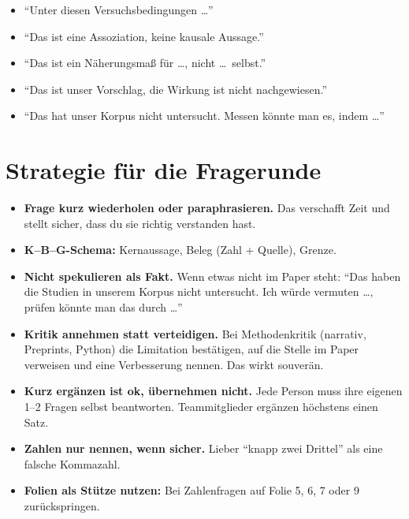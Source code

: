 \documentclass[12pt,a4paper]{article}
\begin{document}
\begin{merke}
\begin{itemize}
  \item \enquote{Unter diesen Versuchsbedingungen \dots}
  \item \enquote{Das ist eine Assoziation, keine kausale Aussage.}
  \item \enquote{Das ist ein Näherungsmaß für \dots, nicht \dots\ selbst.}
  \item \enquote{Das ist unser Vorschlag, die Wirkung ist nicht nachgewiesen.}
  \item \enquote{Das hat unser Korpus nicht untersucht. Messen könnte man es, indem \dots}
\end{itemize}
\end{merke}

\section{Strategie für die Fragerunde}
\label{sec:strategie}

\begin{itemize}
  \item \textbf{Frage kurz wiederholen oder paraphrasieren.} Das verschafft Zeit und stellt sicher, dass du sie richtig verstanden hast.
  \item \textbf{K--B--G-Schema:} Kernaussage, Beleg (Zahl + Quelle), Grenze.
  \item \textbf{Nicht spekulieren als Fakt.} Wenn etwas nicht im Paper steht: \enquote{Das haben die Studien in unserem Korpus nicht untersucht. Ich würde vermuten \dots, prüfen könnte man das durch \dots}
  \item \textbf{Kritik annehmen statt verteidigen.} Bei Methodenkritik (narrativ, Preprints, Python) die Limitation bestätigen, auf die Stelle im Paper verweisen und eine Verbesserung nennen. Das wirkt souverän.
  \item \textbf{Kurz ergänzen ist ok, übernehmen nicht.} Jede Person muss ihre eigenen 1--2 Fragen selbst beantworten. Teammitglieder ergänzen höchstens einen Satz.
  \item \textbf{Zahlen nur nennen, wenn sicher.} Lieber \enquote{knapp zwei Drittel} als eine falsche Kommazahl.
  \item \textbf{Folien als Stütze nutzen:} Bei Zahlenfragen auf Folie 5, 6, 7 oder 9 zurückspringen.
\end{itemize}
\end{document}
